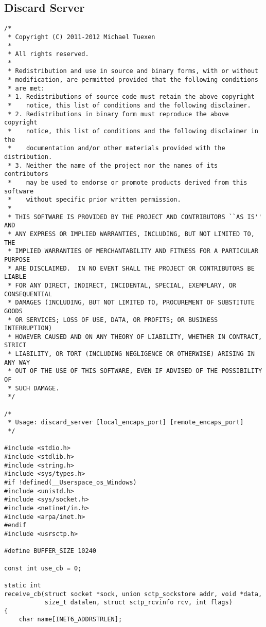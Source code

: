 \documentclass[a4paper]{article}
\begin{document}
\subsection{Discard Server}\label{server}
\begin{verbatim}
/*
 * Copyright (C) 2011-2012 Michael Tuexen
 *
 * All rights reserved.
 *
 * Redistribution and use in source and binary forms, with or without
 * modification, are permitted provided that the following conditions
 * are met:
 * 1. Redistributions of source code must retain the above copyright
 *    notice, this list of conditions and the following disclaimer.
 * 2. Redistributions in binary form must reproduce the above copyright
 *    notice, this list of conditions and the following disclaimer in the
 *    documentation and/or other materials provided with the distribution.
 * 3. Neither the name of the project nor the names of its contributors
 *    may be used to endorse or promote products derived from this software
 *    without specific prior written permission.
 *
 * THIS SOFTWARE IS PROVIDED BY THE PROJECT AND CONTRIBUTORS ``AS IS'' AND
 * ANY EXPRESS OR IMPLIED WARRANTIES, INCLUDING, BUT NOT LIMITED TO, THE
 * IMPLIED WARRANTIES OF MERCHANTABILITY AND FITNESS FOR A PARTICULAR PURPOSE
 * ARE DISCLAIMED.	IN NO EVENT SHALL THE PROJECT OR CONTRIBUTORS BE LIABLE
 * FOR ANY DIRECT, INDIRECT, INCIDENTAL, SPECIAL, EXEMPLARY, OR CONSEQUENTIAL
 * DAMAGES (INCLUDING, BUT NOT LIMITED TO, PROCUREMENT OF SUBSTITUTE GOODS
 * OR SERVICES; LOSS OF USE, DATA, OR PROFITS; OR BUSINESS INTERRUPTION)
 * HOWEVER CAUSED AND ON ANY THEORY OF LIABILITY, WHETHER IN CONTRACT, STRICT
 * LIABILITY, OR TORT (INCLUDING NEGLIGENCE OR OTHERWISE) ARISING IN ANY WAY
 * OUT OF THE USE OF THIS SOFTWARE, EVEN IF ADVISED OF THE POSSIBILITY OF
 * SUCH DAMAGE.
 */

/*
 * Usage: discard_server [local_encaps_port] [remote_encaps_port]
 */

#include <stdio.h>
#include <stdlib.h>
#include <string.h>
#include <sys/types.h>
#if !defined(__Userspace_os_Windows)
#include <unistd.h>
#include <sys/socket.h>
#include <netinet/in.h>
#include <arpa/inet.h>
#endif
#include <usrsctp.h>

#define BUFFER_SIZE 10240

const int use_cb = 0;

static int
receive_cb(struct socket *sock, union sctp_sockstore addr, void *data,
           size_t datalen, struct sctp_rcvinfo rcv, int flags)
{
    char name[INET6_ADDRSTRLEN];


\end{verbatim}
\end{document}
